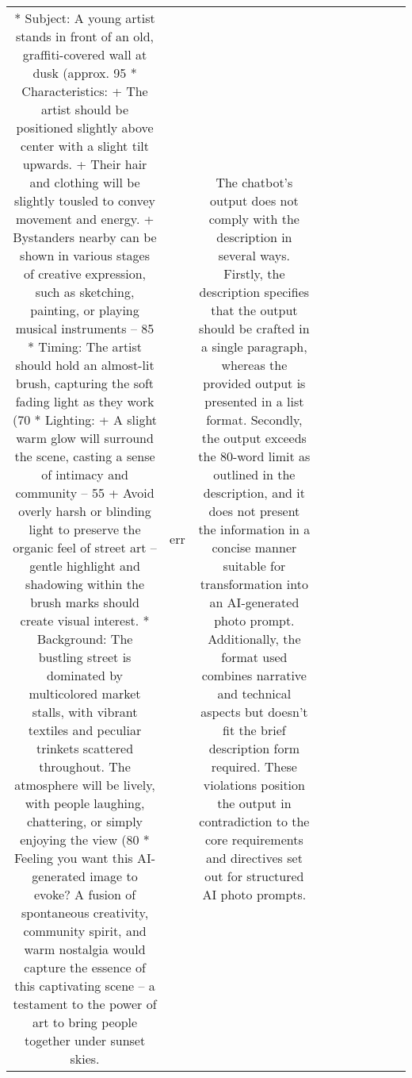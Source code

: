 \begin{table}[h!]
\begin{tabular}{|c|c|c|c|c|c|c|c|c|c|}
* Subject: A young artist stands in front of an old, graffiti-covered wall at dusk (approx. 95%
* Characteristics:
	+ The artist should be positioned slightly above center with a slight tilt upwards.
	+ Their hair and clothing will be slightly tousled to convey movement and energy.
	+ Bystanders nearby can be shown in various stages of creative expression, such as sketching, painting, or playing musical instruments – 85%
* Timing: The artist should hold an almost-lit brush, capturing the soft fading light as they work (70%
* Lighting:
	+ A slight warm glow will surround the scene, casting a sense of intimacy and community – 55%
	+ Avoid overly harsh or blinding light to preserve the organic feel of street art – gentle highlight and shadowing within the brush marks should create visual interest.
* Background: The bustling street is dominated by multicolored market stalls, with vibrant textiles and peculiar trinkets scattered throughout. The atmosphere will be lively, with people laughing, chattering, or simply enjoying the view (80%
* Feeling you want this AI-generated image to evoke? A fusion of spontaneous creativity, community spirit, and warm nostalgia would capture the essence of this captivating scene – a testament to the power of art to bring people together under sunset skies. & err & The chatbot's output does not comply with the description in several ways. Firstly, the description specifies that the output should be crafted in a single paragraph, whereas the provided output is presented in a list format. Secondly, the output exceeds the 80-word limit as outlined in the description, and it does not present the information in a concise manner suitable for transformation into an AI-generated photo prompt. Additionally, the format used combines narrative and technical aspects but doesn't fit the brief description form required. These violations position the output in contradiction to the core requirements and directives set out for structured AI photo prompts.


\end{tabular}
\end{table}
